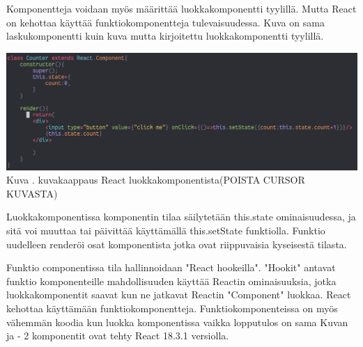 Komponentteja voidaan myös määrittää luokkakomponentti tyylillä. Mutta React on kehottaa käyttää funktiokomponentteja tulevaisuudessa. 
Kuva \nextImageCount {} on sama laskukomponentti kuin kuva \theimgCounter{} mutta kirjoitettu luokkakomponentti tyylillä. 
\medskip
\bigskip


\includegraphics[width=15cm]{src/public/oppar/class_.png}\\
Kuva \getImgCount{}. kuvakaappaus React luokkakomponentista(POISTA CURSOR KUVASTA)
\medskip



Luokkakomponentissa komponentin tilaa säilytetään this.state ominaisuudessa, ja sitä voi muuttaa tai päivittää käyttämällä this.setState funktiolla. 
Funktio uudelleen renderöi osat komponentista jotka ovat riippuvaisia kyseisestä tilasta.
\medskip


Funktio componentissa tila hallinnoidaan "React hookeilla"{}. 
"Hookit"{} antavat funktio komponenteille mahdollisuuden käyttää Reactin ominaisuuksia, 
jotka luokkakomponentit saavat kun ne jatkavat Reactin "Component"{} luokkaa.
%
React kehottaa käyttämään funktiokomponentteja. 
Funktiokomponenteissa on myös vähemmän koodia kun luokka komponentissa vaikka lopputulos on sama
Kuvan \prevImageCount{} ja {\the\numexpr \theimgCounter - 2}{} komponentit ovat tehty React 18.3.1 versiolla.





